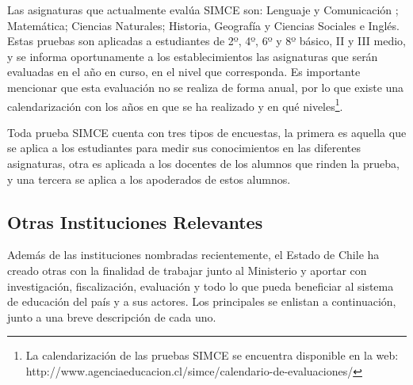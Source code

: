 \begin{description}
\begin{description}
    Las asignaturas que actualmente evalúa SIMCE son: Lenguaje y Comunicación ; Matemática; Ciencias Naturales; Historia, Geografía y Ciencias Sociales e Inglés. Estas pruebas son aplicadas a estudiantes de 2º, 4º, 6º y 8º básico, II  y III medio, y se informa oportunamente a los establecimientos las asignaturas que serán evaluadas en el año en curso, en el nivel que corresponda. Es importante mencionar que esta evaluación no se realiza de forma anual, por lo que existe una calendarización con los años en que se ha realizado y en qué niveles\footnote{La calendarización de las pruebas SIMCE se encuentra disponible en la web: http://www.agenciaeducacion.cl/simce/calendario-de-evaluaciones/}.
    
    Toda prueba SIMCE cuenta con tres tipos de encuestas, la primera es aquella que se aplica a los estudiantes para medir sus conocimientos en las diferentes asignaturas, otra es aplicada a los docentes de los alumnos que rinden la prueba, y una tercera se aplica a los apoderados de estos alumnos.
    \end{description}
\end{description}

\subsection{Otras Instituciones Relevantes}
Además de las instituciones nombradas recientemente, el Estado de Chile ha creado otras con la finalidad de trabajar junto al Ministerio y aportar con investigación, fiscalización, evaluación y todo lo que pueda beneficiar al sistema de educación del país y a sus actores. Los principales se enlistan a continuación, junto a una breve descripción de cada uno.


